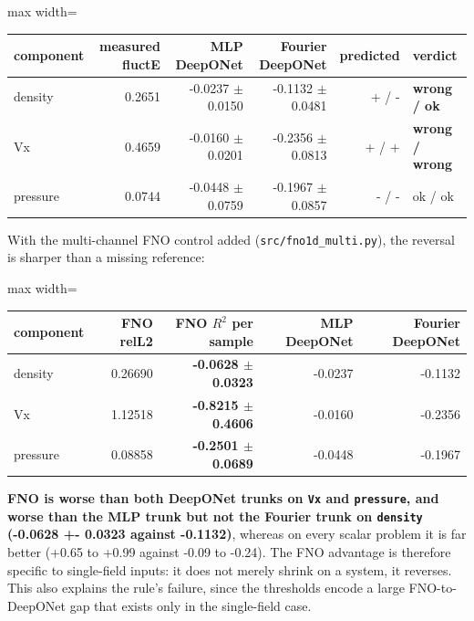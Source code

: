 \documentclass[preprint,12pt]{elsarticle}
\begin{document}
\begin{center}
\begin{adjustbox}{max width=\linewidth}
\small
\begin{tabular}{lrrrrl}
\toprule
component & measured fluctE & MLP DeepONet & Fourier DeepONet & predicted & verdict \\
\midrule
density & 0.2651 & -0.0237 $\pm$ 0.0150 & -0.1132 $\pm$ 0.0481 & + / - & \textbf{wrong / ok} \\
Vx & 0.4659 & -0.0160 $\pm$ 0.0201 & -0.2356 $\pm$ 0.0813 & + / + & \textbf{wrong / wrong} \\
pressure & 0.0744 & -0.0448 $\pm$ 0.0759 & -0.1967 $\pm$ 0.0857 & - / - & ok / ok \\
\bottomrule
\end{tabular}
\end{adjustbox}
\end{center}


With the multi-channel FNO control added (\texttt{src/fno1d\_multi.py}), the reversal is sharper than a missing reference:

\begin{center}
\begin{adjustbox}{max width=\linewidth}
\small
\begin{tabular}{lrrrr}
\toprule
component & FNO relL2 & \textbf{FNO $R^2$ per sample} & MLP DeepONet & Fourier DeepONet \\
\midrule
density & 0.26690 & \textbf{-0.0628 $\pm$ 0.0323} & -0.0237 & -0.1132 \\
Vx & 1.12518 & \textbf{-0.8215 $\pm$ 0.4606} & -0.0160 & -0.2356 \\
pressure & 0.08858 & \textbf{-0.2501 $\pm$ 0.0689} & -0.0448 & -0.1967 \\
\bottomrule
\end{tabular}
\end{adjustbox}
\end{center}


\textbf{FNO is worse than both DeepONet trunks on \texttt{Vx} and \texttt{pressure}, and worse than the MLP trunk but not the Fourier trunk on \texttt{density} (-0.0628 +- 0.0323 against -0.1132)}, whereas on every scalar problem it is far better (+0.65 to +0.99 against -0.09 to -0.24). The FNO advantage is therefore specific to single-field inputs: it does not merely shrink on a system, it reverses. This also explains the rule's failure, since the thresholds encode a large FNO-to-DeepONet gap that exists only in the single-field case.
\end{document}
